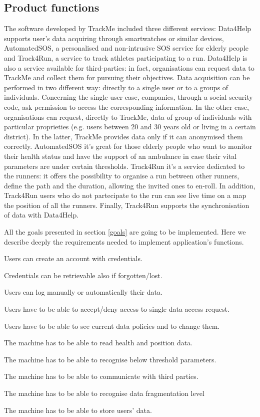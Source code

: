 \documentclass{article}
\begin{document}
\subsection{Product functions}
The software developed by TrackMe included three different services:
Data4Help supports user's data acquiring through smartwatches or 
similar devices, AutomatedSOS, a personalised and non-intrusive SOS 
service for elderly people and Track4Run, a service to track athletes 
participating to a run.
Data4Help is also a service available for third-parties: in fact, 
organisations can request data to TrackMe and collect them for 
pursuing their objectives.
Data acquisition can be performed in two different way: directly to a
single user or to a groups of individuals.
Concerning the single user case, companies, through a social security
code, ask permission to access the corresponding information. 
In the other case, organisations can request, directly to TrackMe,
data of group of individuals with particular proprieties (e.g. users 
between 20 and 30 years old or living in a certain district).
In the latter, TrackMe provides data only if it can anonymised them
correctly.
AutomatedSOS it’s great for those elderly people who want to monitor 
their health status and have the support of an ambulance in case their
vital parameters are under certain thresholds.
Track4Run it’s a service dedicated to the runners: it offers the 
possibility to organise a run between other runners, define the path 
and the duration, allowing the invited ones to en-roll. In addition, 
Track4Run users who do not partecipate to the run can see live time 
on a map the position of all the runners. 
Finally, Track4Run supports the synchronisation of data with 
Data4Help.

All the goals presented in section \ref{goals} are going to be 
implemented. Here we describe deeply the requirements needed to
implement application's functions.
	
\begin{enumerate}[label={[R\arabic*]}]
    	\item Users can create an account with credentials.
    	\item Credentials can be retrievable also if forgotten/lost.
    	\item Users can log manually or automatically their data.
    	\item Users have to be able to accept/deny access to single data access request.
    	\item Users have to be able to see current data policies and to change them.
    	\item The machine has to be able to read health and position data.
		\item The machine has to be able to recognise below threshold parameters.
		\item The machine has to be able to communicate with third parties.
		\item The machine has to be able to recognise data fragmentation level 
		\item The machine has to be able to store users’ data. 
\end{enumerate}
\newpage
\end{document}
